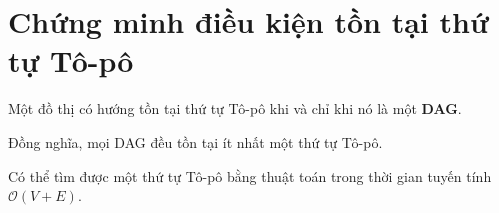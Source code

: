 \section{Chứng minh điều kiện tồn tại thứ tự Tô-pô}

\begin{giathuyet}
    Một đồ thị có hướng tồn tại thứ tự Tô-pô khi và chỉ khi nó là một \textbf{DAG}.
\end{giathuyet}

\begin{giathuyet}
    Đồng nghĩa, mọi DAG đều tồn tại ít nhất một thứ tự Tô-pô.
\end{giathuyet}

\begin{giathuyet}
    Có thể tìm được một thứ tự Tô-pô bằng thuật toán trong thời gian tuyến tính \( \mathcal{O}(V + E) \).
\end{giathuyet}

